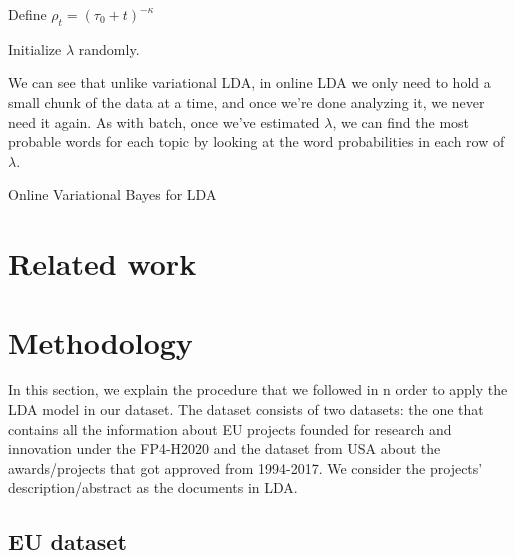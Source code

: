 \documentclass[12pt]{report}
\begin{document}
\begin{algorithm}
\SetAlgoLined
Define $\rho_t = (\tau_{0} + t)^{-\kappa}$

Initialize $\lambda$ randomly.


We can see that unlike variational LDA, in online LDA we only need to hold a
small chunk of the data at a time, and once we’re done analyzing it, we never
need it again. As with batch, once we’ve estimated $\lambda$, we can find the 
most probable words for each topic by looking at the word probabilities in 
each row of $\lambda$.


\caption{Online Variational Bayes for LDA} 
\end{algorithm}



\section{Related work}

\section{Methodology}

In this section, we explain the procedure that we followed in n order to apply the LDA model in our dataset. The dataset consists of two datasets: the one that contains all the information about EU projects founded for research and innovation under the FP4-H2020 and the dataset from USA about the awards/projects that got approved from 1994-2017. We consider the projects' description/abstract as the documents in LDA.
 

\subsection{EU dataset}
\end{document}
